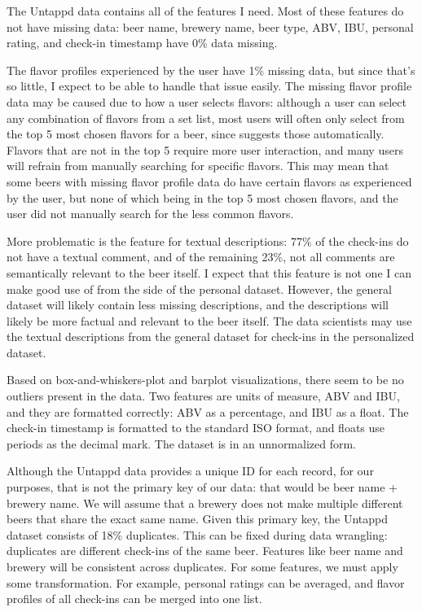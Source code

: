 \documentclass[sigconf]{acmart}
\begin{document}
The Untappd data contains all of the features I need.
Most of these features do not have missing data: beer name, brewery name, beer type, ABV, IBU, personal rating, and check-in timestamp have 0\% data missing.

The flavor profiles experienced by the user have 1\% missing data, but since that's so little, I expect to be able to handle that issue easily.
The missing flavor profile data may be caused due to how a user selects flavors: although a user can select any combination of flavors from a set list, most users will often only select from the top 5 most chosen flavors for a beer, since \citeauthor{untappd} suggests those automatically.
Flavors that are not in the top 5 require more user interaction, and many users will refrain from manually searching for specific flavors.
This may mean that some beers with missing flavor profile data do have certain flavors as experienced by the user, but none of which being in the top 5 most chosen flavors, and the user did not manually search for the less common flavors.

More problematic is the feature for textual descriptions: 77\% of the check-ins do not have a textual comment, and of the remaining 23\%, not all comments are semantically relevant to the beer itself.
I expect that this feature is not one I can make good use of from the side of the personal dataset.
However, the general dataset will likely contain less missing descriptions, and the descriptions will likely be more factual and relevant to the beer itself.
The data scientists may use the textual descriptions from the general dataset for check-ins in the personalized dataset.

Based on box-and-whiskers-plot and barplot visualizations, there seem to be no outliers present in the data.
Two features are units of measure, ABV and IBU, and they are formatted correctly: ABV as a percentage, and IBU as a float.
The check-in timestamp is formatted to the standard ISO format, and floats use periods as the decimal mark.
The dataset is in an unnormalized form.

Although the Untappd data provides a unique ID for each record, for our purposes, that is not the primary key of our data: that would be beer name + brewery name.
We will assume that a brewery does not make multiple different beers that share the exact same name.
Given this primary key, the Untappd dataset consists of 18\% duplicates.
This can be fixed during data wrangling: duplicates are different check-ins of the same beer.
Features like beer name and brewery will be consistent across duplicates.
For some features, we must apply some transformation. 
For example, personal ratings can be averaged, and flavor profiles of all check-ins can be merged into one list.
\end{document}
